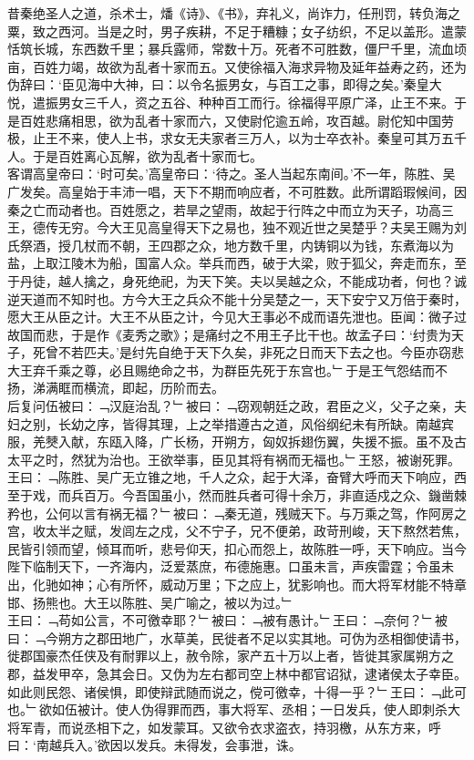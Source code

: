 昔秦绝圣人之道，杀术士，燔《诗》、《书》，弃礼义，尚诈力，任刑罚，转负海之粟，致之西河。当是之时，男子疾耕，不足于糟糠；女子纺织，不足以盖形。遣蒙恬筑长城，东西数千里；暴兵露师，常数十万。死者不可胜数，僵尸千里，流血顷亩，百姓力竭，故欲为乱者十家而五。又使徐福入海求异物及延年益寿之药，还为伪辞曰：‘臣见海中大神，曰：以令名振男女，与百工之事，即得之矣。’秦皇大悦，遣振男女三千人，资之五谷、种种百工而行。徐福得平原广泽，止王不来。于是百姓悲痛相思，欲为乱者十家而六，又使尉佗逾五岭，攻百越。尉佗知中国劳极，止王不来，使人上书，求女无夫家者三万人，以为士卒衣补。秦皇可其万五千人。于是百姓离心瓦解，欲为乱者十家而七。\\
客谓高皇帝曰：‘时可矣。’高皇帝曰：‘待之。圣人当起东南间。’不一年，陈胜、吴广发矣。高皇始于丰沛一唱，天下不期而响应者，不可胜数。此所谓蹈瑕候间，因秦之亡而动者也。百姓愿之，若旱之望雨，故起于行阵之中而立为天子，功高三王，德传无穷。今大王见高皇得天下之易也，独不观近世之吴楚乎？夫吴王赐为刘氏祭酒，授几杖而不朝，王四郡之众，地方数千里，内铸铜以为钱，东煮海以为盐，上取江陵木为船，国富人众。举兵而西，破于大梁，败于狐父，奔走而东，至于丹徒，越人擒之，身死绝祀，为天下笑。夫以吴越之众，不能成功者，何也？诚逆天道而不知时也。方今大王之兵众不能十分吴楚之一，天下安宁又万倍于秦时，愿大王从臣之计。大王不从臣之计，今见大王事必不成而语先泄也。臣闻：微子过故国而悲，于是作《麦秀之歌》；是痛纣之不用王子比干也。故孟子曰：‘纣贵为天子，死曾不若匹夫。’是纣先自绝于天下久矣，非死之日而天下去之也。今臣亦窃悲大王弃千乘之尊，必且赐绝命之书，为群臣先死于东宫也。﹂于是王气怨结而不扬，涕满眶而横流，即起，历阶而去。\\
后复问伍被曰：﹁汉庭治乱？﹂被曰：﹁窃观朝廷之政，君臣之义，父子之亲，夫妇之别，长幼之序，皆得其理，上之举措遵古之道，风俗纲纪未有所缺。南越宾服，羌僰入献，东瓯入降，广长杨，开朔方，匈奴拆翅伤翼，失援不振。虽不及古太平之时，然犹为治也。王欲举事，臣见其将有祸而无福也。﹂王怒，被谢死罪。王曰：﹁陈胜、吴广无立锥之地，千人之众，起于大泽，奋臂大呼而天下响应，西至于戏，而兵百万。今吾国虽小，然而胜兵者可得十余万，非直适戍之众、鐖凿棘矜也，公何以言有祸无福？﹂被曰：﹁秦无道，残贼天下。与万乘之驾，作阿房之宫，收太半之赋，发闾左之戍，父不宁子，兄不便弟，政苛刑峻，天下熬然若焦，民皆引领而望，倾耳而听，悲号仰天，扣心而怨上，故陈胜一呼，天下响应。当今陛下临制天下，一齐海内，泛爱蒸庶，布德施惠。口虽未言，声疾雷霆；令虽未出，化驰如神；心有所怀，威动万里；下之应上，犹影响也。而大将军材能不特章邯、扬熊也。大王以陈胜、吴广喻之，被以为过。﹂\\
王曰：﹁苟如公言，不可徼幸耶？﹂被曰：﹁被有愚计。﹂王曰：﹁奈何？﹂被曰：﹁今朔方之郡田地广，水草美，民徙者不足以实其地。可伪为丞相御使请书，徙郡国豪杰任侠及有耐罪以上，赦令除，家产五十万以上者，皆徙其家属朔方之郡，益发甲卒，急其会日。又伪为左右都司空上林中都官诏狱，逮诸侯太子幸臣。如此则民怨、诸侯惧，即使辩武随而说之，傥可徼幸，十得一乎？﹂王曰：﹁此可也。﹂欲如伍被计。使人伪得罪而西，事大将军、丞相；一日发兵，使人即刺杀大将军青，而说丞相下之，如发蒙耳。又欲令衣求盗衣，持羽檄，从东方来，呼曰：‘南越兵入。’欲因以发兵。未得发，会事泄，诛。
